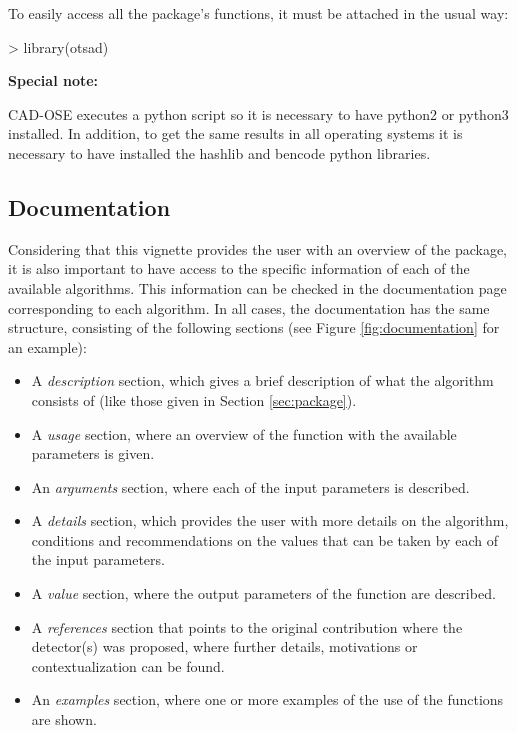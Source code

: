 \documentclass[a4paper]{article}
\begin{document}
To easily access all the package’s functions, it must be attached in the usual way:

\begin{Schunk}
\begin{Sinput}
> library(otsad)
\end{Sinput}
\end{Schunk}

\textbf{Special note: }

CAD-OSE executes a python script so it is necessary to have python2 or python3 installed. In addition, to get the same results in all operating systems it is necessary to have installed the hashlib and bencode python libraries.

\subsection{Documentation}\label{sec:documentation}

Considering that this vignette provides the user with an overview of the  package, it is also important to have access to the specific information of each of the available algorithms. This information can be checked in the documentation page corresponding to each algorithm. In all cases, the documentation has the same structure, consisting of the following sections (see Figure \ref{fig:documentation} for an example):

\begin{itemize}
\item A \emph{description} section, which gives a brief description of what the algorithm consists of (like those given in Section \ref{sec:package}).
\item A \emph{usage} section, where an overview of the function with the available parameters is given.
\item An \emph{arguments} section, where each of the input parameters is described.
\item A \emph{details} section, which provides the user with more details on the algorithm, conditions and recommendations on the values that can be taken by each of the input parameters.
\item A \emph{value} section, where the output parameters of the function are described.
\item A \emph{references} section that points to the original contribution where the detector(s) was proposed, where further details, motivations or contextualization can be found.
\item An \emph{examples} section, where one or more examples of the use of the functions are shown.
\end{itemize}
\end{document}
